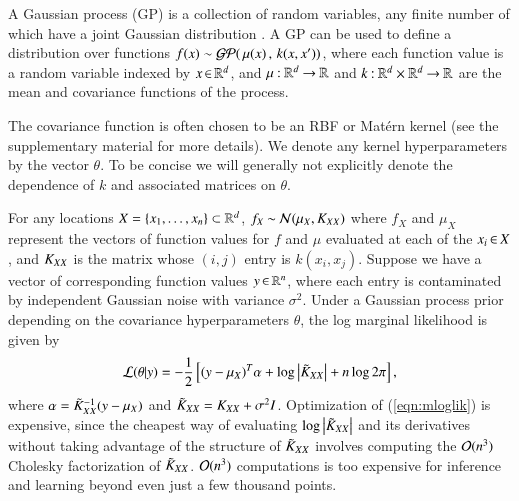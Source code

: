A Gaussian process (GP) is a collection of random variables, any finite number
of which have a joint Gaussian distribution \citep[e.g.,][]{rasmussen06}. A GP
can be used to define a distribution over functions $f(x) \sim \mathcal{GP}(\,\mu
(x)\,,\,k(x, x'))$, where each function value is a random variable indexed by $x
\operatorname{\in} \mathbb{R}^d$, and $\mu\mathbin{:} \mathbb{R}^d \mathbin{\rightarrow} \mathbb{R}$ and $k\mathbin{:}
\mathbb{R}^d \times\mathbb{R}^d\mathbin{\rightarrow} \mathbb{R}$ are the mean and covariance
functions of the process.

The covariance function is often chosen to be an RBF or Mat\'ern kernel (see the
supplementary material for more details). We denote any kernel hyperparameters
by the vector $\theta$. To be concise we will generally not explicitly denote
the dependence of $k$ and associated matrices on $\theta$.

For any locations $X = \{x_1,\ldots,x_n\} \subset \mathbb{R}^d$, $f_X \mathbin{\sim} \mathcal{N}
(\mu_X, K_{XX})$ where $f_X$ and $\mu_X$ represent the vectors of function
values for $f$ and $\mu$ evaluated at each of the $x_i \operatorname{\in} X$, and $K_{XX}$ is
the matrix whose $(i,j)$ entry is $k(x_i, x_j)$. Suppose we have a vector of
corresponding function values $y \operatorname{\in} \mathbb{R}^n$, where each entry is contaminated
by independent Gaussian noise with variance $\sigma^2$. Under a Gaussian process
prior depending on the covariance hyperparameters $\theta$, the log marginal
likelihood is given by
\begin{equation}\label{eqn:mloglik}
    \mathcal{L}(\theta|y) = -\frac{1}{2}\left[(y-\mu_X)^T\alpha + \log\left\lvert\tilde{K}_{XX}\right\rvert
    + n\log 2\pi\right],
\end{equation}
where $\alpha = \tilde{K}_{XX}^{-1}(y-\mu_X)$ and $\tilde{K}_{XX} = K_{XX} +\sigma^2I$.
Optimization of (\ref{eqn:mloglik}) is expensive, since the cheapest way of
evaluating $\log\left\lvert\tilde{K}_{XX}\right\rvert$ and its derivatives without taking advantage
of the structure of $\tilde{K}_{XX}$ involves computing the $\mathcal{O}(n^3)$ Cholesky
factorization of $\tilde{K}_{XX}$. $\mathcal{O}(n^3)$ computations is too expensive for
inference and learning beyond even just a few thousand points.

